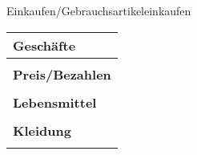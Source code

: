 \begin{discourse}{Einkaufen/Gebrauchsartikel}{einkaufen}
\begin{tabular}{l|l}
	\multicolumn{2}{l}{\textbf{Geschäfte}} \\
	\hline
	\multicolumn{2}{l}{} \\

	\multicolumn{2}{l}{\textbf{Preis/Bezahlen}} \\
	\hline
	\multicolumn{2}{l}{} \\

	\multicolumn{2}{l}{\textbf{Lebensmittel}} \\
	\hline
	\multicolumn{2}{l}{} \\

	\multicolumn{2}{l}{\textbf{Kleidung}} \\
	\hline
	\multicolumn{2}{l}{}
\end{tabular}
\end{discourse}
